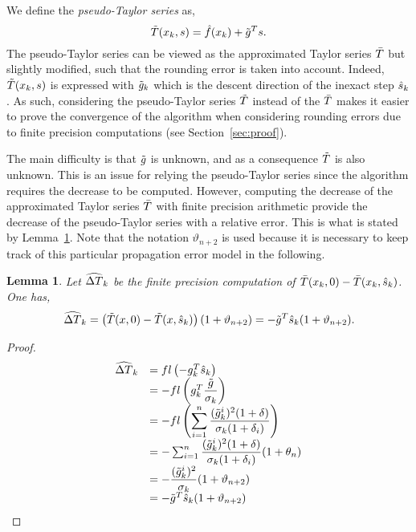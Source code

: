 \documentclass{article}[12pt]
\newtheorem{lemma}[]{Lemma}
\begin{document}
	
	We define the \emph{pseudo-Taylor series} as,
	\begin{equation}
		\tilde{T}(x_k,s) = \hat{f}(x_k) + \tilde{g}^Ts.
	\end{equation} The pseudo-Taylor series can be viewed as the approximated Taylor series $\bar{T}$ but slightly modified, such that the rounding error is taken into account. Indeed, $\tilde{T}(x_k,s)$ is expressed with $\tilde{g}_k$ which is the descent direction of the inexact step $\hat{s}_{k}$. As such, considering the pseudo-Taylor series $\tilde{T}$ instead of the $\bar{T}$ makes it easier to prove the convergence of the algorithm when considering rounding errors due to finite precision computations (see Section~\ref{sec:proof}).

    The main difficulty is that $\tilde{g}$ is unknown, and as a consequence $\tilde{T}$ is also unknown. This is an issue for relying the pseudo-Taylor series since the algorithm requires the decrease to be computed. However, computing the decrease of the approximated Taylor series $\bar{T}$ with finite precision arithmetic provide the decrease of the pseudo-Taylor series with a relative error. This is what is stated by Lemma~\ref{lem:pseudo_reduction}. Note that the notation $\vartheta_{n+2}$ is used because it is necessary to keep track of this particular propagation error model in the following.
    \begin{lemma}
    	\label{lem:pseudo_reduction}
    	Let $\widehat{\Delta T}_k$ be the finite precision computation of $\bar{T}(x_k,0) - \bar{T}(x_k,\hat{s}_{k})$. One has,
    	\begin{equation}
    		\widehat{\Delta T}_k = \left(\tilde{T}(x,0) - \tilde{T}(x,\hat{s}_{k})\right) (1+\vartheta_{n+2}) = -\tilde{g}^T \hat{s}_{k} (1+\vartheta_{n+2}).
    	\end{equation}
    \end{lemma}
	\begin{proof}
		\begin{equation}
			\begin{array}{ll}
				\widehat{\Delta T}_k & = fl\left(-g_k^T\hat{s}_{k}\right)\\
				& = -fl\left(g_k^T\dfrac{\tilde{g}}{\sigma_k}\right)\\
				& = \displaystyle - fl\left(\sum_{i=1}^{n} \dfrac{(\tilde{g}_k^i)^2(1+\delta)}{\sigma_k(1+\delta_i)}\right)\\
				& = -\sum_{i=1}^{n} \dfrac{(\tilde{g}_k^i)^2(1+\delta)}{\sigma_k(1+\delta_i)}(1+\theta_n)\\
				& = -\dfrac{(\tilde{g}_k^i)^2}{\sigma_k}(1+\vartheta_{n+2})\\
				& = -\tilde{g}^T \hat{s}_{k} (1+\vartheta_{n+2})
			\end{array}
		\end{equation}
	\end{proof}
\end{document}
